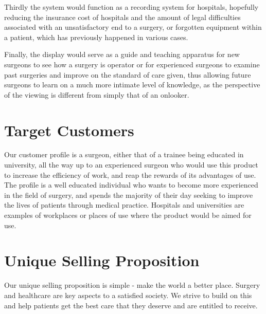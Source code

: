\documentclass{article}
\begin{document}
Thirdly the system would function as a recording system for hospitals, hopefully reducing the insurance cost of hospitals and the amount of legal difficulties associated with an unsatisfactory end to a surgery, or forgotten equipment within a patient, which has previously happened in various cases.

Finally, the display would serve as a guide and teaching apparatus for new surgeons to see how a surgery is operator or for experienced surgeons to examine past surgeries and improve on the standard of care given, thus allowing future surgeons to learn on a much more intimate level of knowledge, as the perspective of the viewing is different from simply that of an onlooker.






\section{Target Customers}
Our customer profile is a surgeon, either that of a trainee being educated in university, all the way up to an experienced surgeon who would use this product to increase the efficiency of work, and reap the rewards of its advantages of use. The profile is a well educated individual who wants to become more experienced in the field of surgery, and spends the majority of their day seeking to improve the lives of patients through medical practice. Hospitals and universities are examples of workplaces or places of use where the product would be aimed for use.




\pagebreak

\section{Unique Selling Proposition}
Our unique selling proposition is simple - make the world a better place. Surgery and healthcare are key aspects to a satisfied society. We strive to build on this and help patients get the best care that they deserve and are entitled to receive. 
\end{document}
